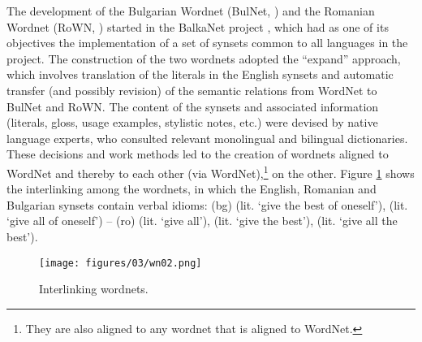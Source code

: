 \documentclass[output=paper,colorlinks,citecolor=brown]{langscibook}
\begin{document}
The development of the Bulgarian Wordnet (BulNet, \citealt{Koeva2010}) and the Romanian Wordnet (RoWN, \citealt{rown}) started in the BalkaNet project \citep{BalkaNet}, which had as one of its objectives the implementation of a set of synsets common to all languages in the project. The construction of the two wordnets adopted the ``expand'' approach, which involves translation of the literals in the English synsets and automatic transfer (and possibly revision) of the semantic relations from WordNet \citep{Fellbaum1998} to BulNet and RoWN. The content of the synsets and associated information (literals, gloss, usage examples, stylistic notes, etc.) were devised by native language experts, who consulted relevant monolingual and bilingual dictionaries. These decisions and work methods led to the creation of wordnets aligned to WordNet and thereby to each other (via WordNet),\footnote{They are also aligned to any wordnet that is aligned to WordNet.} on the other. Figure \ref{fig:wn} shows the interlinking among the wordnets, in which the English, Romanian and Bulgarian synsets contain verbal idioms: (bg)    (lit. `give the best of oneself'),   (lit. `give all of oneself') -- (ro)   (lit. `give all'),  (lit. `give the best'),  (lit. `give all the best').



\begin{figure}
\texttt{[image: figures/03/wn02.png]}
\caption{Interlinking wordnets.} \label{fig:wn}
\end{figure}
\end{document}
